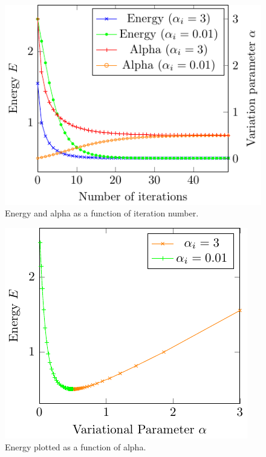 \begin{figure}[th]
	\begin{center}
		\includegraphics[scale=0.9]{graphs/ho-e-alpha-iterations.pdf}
		\caption{
			Energy and alpha as a function of iteration number. %
			}
		\label{fig:Ho_it}
	\end{center}
\end{figure}
\begin{figure}[th]
	\begin{center}
		\includegraphics[scale=0.9]{graphs/ho-e-alpha.pdf}
		\caption{
			Energy plotted as a function of alpha. %
		}
		\label{fig:Ho_rel}
	\end{center}
\end{figure}


